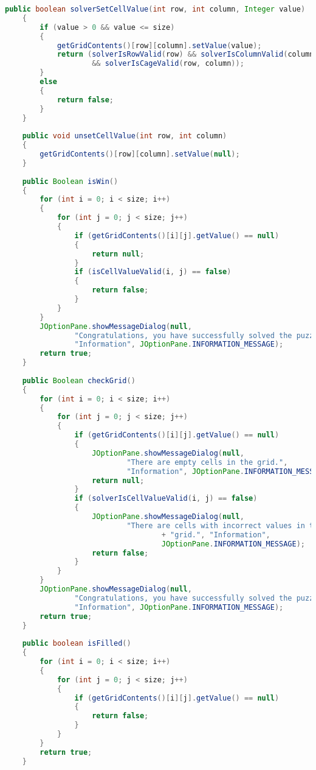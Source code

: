 \begin{lstlisting}[language=Java,basicstyle=\tiny,caption=Grid.java]
    public boolean solverSetCellValue(int row, int column, Integer value)
    {
        if (value > 0 && value <= size)
        {
            getGridContents()[row][column].setValue(value);
            return (solverIsRowValid(row) && solverIsColumnValid(column) 
                    && solverIsCageValid(row, column));
        }
        else
        {
            return false;
        }   
    }
    
    public void unsetCellValue(int row, int column)
    {
        getGridContents()[row][column].setValue(null);
    }
    
    public Boolean isWin()
    {
        for (int i = 0; i < size; i++)
        {
            for (int j = 0; j < size; j++)
            {
                if (getGridContents()[i][j].getValue() == null)
                {
                    return null;
                }
                if (isCellValueValid(i, j) == false)
                {
                    return false;
                }
            }
        }
        JOptionPane.showMessageDialog(null, 
                "Congratulations, you have successfully solved the puzzle!", 
                "Information", JOptionPane.INFORMATION_MESSAGE);
        return true;
    }
    
    public Boolean checkGrid()
    {
        for (int i = 0; i < size; i++)
        {
            for (int j = 0; j < size; j++)
            {
                if (getGridContents()[i][j].getValue() == null)
                {
                    JOptionPane.showMessageDialog(null, 
                            "There are empty cells in the grid.", 
                            "Information", JOptionPane.INFORMATION_MESSAGE);
                    return null;
                }
                if (solverIsCellValueValid(i, j) == false)
                {
                    JOptionPane.showMessageDialog(null,
                            "There are cells with incorrect values in the " 
                                    + "grid.", "Information", 
                                    JOptionPane.INFORMATION_MESSAGE);
                    return false;
                }
            }
        }
        JOptionPane.showMessageDialog(null, 
                "Congratulations, you have successfully solved the puzzle!", 
                "Information", JOptionPane.INFORMATION_MESSAGE);
        return true;
    }
    
    public boolean isFilled()
    {
        for (int i = 0; i < size; i++)
        {
            for (int j = 0; j < size; j++)
            {
                if (getGridContents()[i][j].getValue() == null)
                {
                    return false;
                }
            }
        }
        return true;
    }
    

\end{lstlisting}
